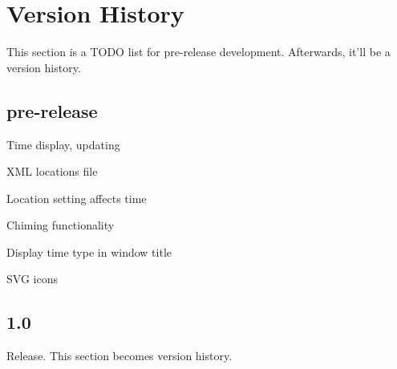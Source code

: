 \section{Version History}

This section is a TODO list for pre-release development. Afterwards, it'll be a version history.

\subsection{pre-release}

Time display, updating

XML locations file

Location setting affects time

Chiming functionality

Display time type in window title

SVG icons

\subsection{1.0}

Release. This section becomes version history.

